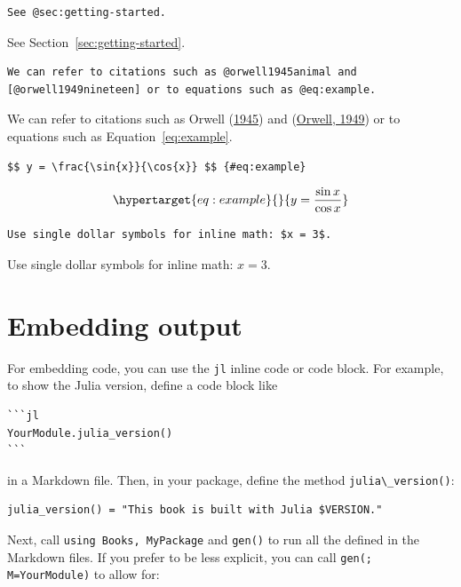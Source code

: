 \documentclass[
  notoc %
]{tufte-book}
\newcommand{\passthrough}[1]{#1}
\begin{document}
\begin{lstlisting}
See @sec:getting-started.
\end{lstlisting}

See Section~\ref{sec:getting-started}.

\begin{lstlisting}
We can refer to citations such as @orwell1945animal and
[@orwell1949nineteen] or to equations such as @eq:example.
\end{lstlisting}

We can refer to citations such as Orwell
(\protect\hyperlink{ref-orwell1945animal}{1945}) and
(\protect\hyperlink{ref-orwell1949nineteen}{Orwell, 1949}) or to
equations such as Equation~\ref{eq:example}.

\begin{lstlisting}
$$ y = \frac{\sin{x}}{\cos{x}} $$ {#eq:example}
\end{lstlisting}

\begin{equation}\protect\hypertarget{eq:example}{}{ y = \frac{\sin{x}}{\cos{x}} }\label{eq:example}\end{equation}

\begin{lstlisting}
Use single dollar symbols for inline math: $x = 3$.
\end{lstlisting}

Use single dollar symbols for inline math: \(x = 3\).

\hypertarget{sec:embedding-output}{%
\section{Embedding output}\label{sec:embedding-output}}

For embedding code, you can use the \passthrough{\lstinline!jl!} inline
code or code block. For example, to show the Julia version, define a
code block like

\begin{lstlisting}
```jl
YourModule.julia_version()
```
\end{lstlisting}

in a Markdown file. Then, in your package, define the method
\passthrough{\lstinline!julia\_version()!}:

\begin{lstlisting}
julia_version() = "This book is built with Julia $VERSION."
\end{lstlisting}

Next, call \passthrough{\lstinline!using Books, MyPackage!} and
\passthrough{\lstinline!gen()!} to run all the defined in the Markdown
files. If you prefer to be less explicit, you can call
\passthrough{\lstinline!gen(; M=YourModule)!} to allow for:
\end{document}
